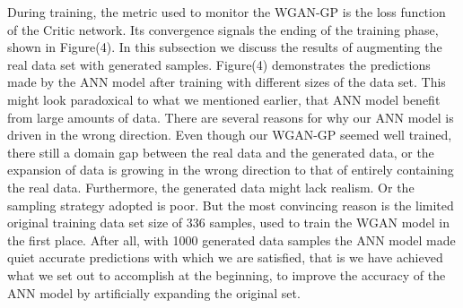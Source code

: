 \documentclass[draft, a4, 10pt, onecolumn]{IEEEtran}
\begin{document}
During training, the metric used to monitor the WGAN-GP is the loss function of the Critic network. Its convergence signals the ending of the training phase, shown in Figure(4).
In this subsection we discuss the results of augmenting the real data set with generated samples. Figure(4) demonstrates the predictions made by the ANN model after training with different sizes of the data set.
This might look paradoxical to what we mentioned earlier, that ANN model benefit from large amounts of data. There are several reasons for why our ANN model is driven in the wrong direction. Even though our WGAN-GP seemed well trained, there still a domain gap between the real data and the generated data, or the expansion of data is growing in the wrong direction to that of entirely containing the real data. Furthermore, the generated data might lack realism. Or the sampling strategy adopted is poor. But the most convincing reason is the limited original training data set size of 336 samples, used to train the WGAN model in the first place. After all, with 1000 generated data samples the ANN model made quiet accurate predictions with which we are satisfied, that is we have achieved what we set out to accomplish at the beginning, to improve the accuracy of the ANN model by artificially expanding the original set.
\end{document}
